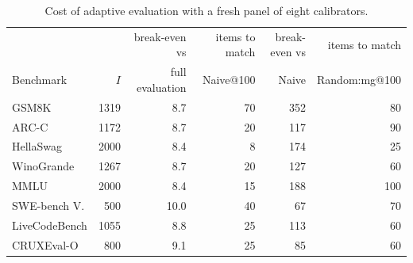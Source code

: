 \begin{table}[htbp]
\centering\footnotesize
\caption{Cost of adaptive evaluation with a fresh panel of eight calibrators.}
\label{tab:cost}
\begin{tabular}{@{}lrrrrr@{}}
\toprule
 & & break-even vs & items to match & break-even vs & items to match \\
Benchmark & $I$ & full evaluation & Naive@100 & Naive & Random:mg@100 \\
\midrule
GSM8K & 1319 & 8.7 & 70 & 352 & 80 \\
ARC-C & 1172 & 8.7 & 20 & 117 & 90 \\
HellaSwag & 2000 & 8.4 & 8 & 174 & 25 \\
WinoGrande & 1267 & 8.7 & 20 & 127 & 60 \\
MMLU & 2000 & 8.4 & 15 & 188 & 100 \\
SWE-bench V. & 500 & 10.0 & 40 & 67 & 70 \\
LiveCodeBench & 1055 & 8.8 & 25 & 113 & 60 \\
CRUXEval-O & 800 & 9.1 & 25 & 85 & 60 \\
\bottomrule
\end{tabular}
\end{table}
